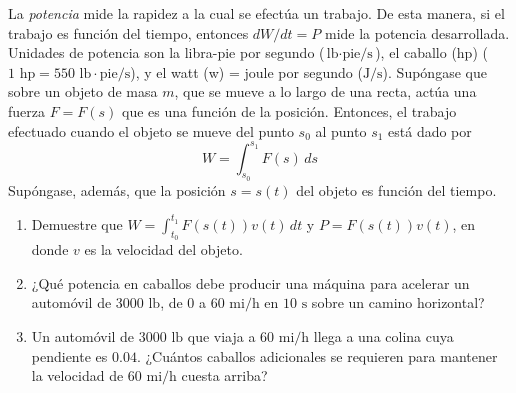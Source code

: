 \item La \textit{potencia} mide la rapidez a la cual se efectúa un trabajo. De esta manera, si el trabajo es función del tiempo, entonces $dW/dt = P$ mide la potencia desarrollada. Unidades de potencia son la libra-pie por segundo ($\text{lb}\cdot\text{pie/s}$), el caballo (hp) ($1 \text{ hp} = 550 \text{ lb}\cdot\text{pie/s}$), y el watt (w) = joule por segundo ($\text{J/s}$). Supóngase que sobre un objeto de masa $m$, que se mueve a lo largo de una recta, actúa una fuerza $F = F(s)$ que es una función de la posición. Entonces, el trabajo efectuado cuando el objeto se mueve del punto $s_0$ al punto $s_1$ está dado por
$$W = \int_{s_0}^{s_1} F(s) \, ds$$
Supóngase, además, que la posición $s = s(t)$ del objeto es función del tiempo.
\begin{enumerate}
    \item[(a)] Demuestre que $W = \int_{t_0}^{t_1} F(s(t)) v(t) \, dt$ y $P = F(s(t)) v(t)$, en donde $v$ es la velocidad del objeto.
    \item[(b)] ¿Qué potencia en caballos debe producir una máquina para acelerar un automóvil de $3000 \text{ lb}$, de 0 a $60 \text{ mi/h}$ en $10 \text{ s}$ sobre un camino horizontal?
    \item[(c)] Un automóvil de $3000 \text{ lb}$ que viaja a $60 \text{ mi/h}$ llega a una colina cuya pendiente es $0.04$. ¿Cuántos caballos adicionales se requieren para mantener la velocidad de $60 \text{ mi/h}$ cuesta arriba?
\end{enumerate}

